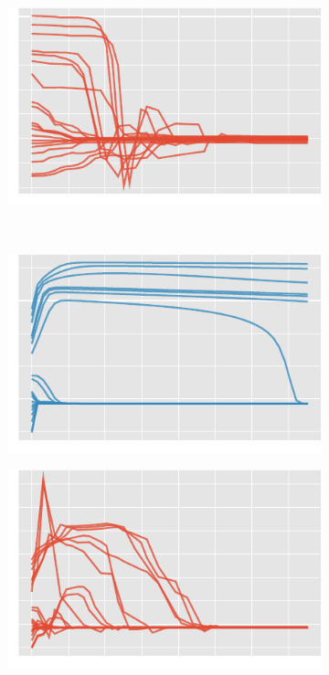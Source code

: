 \begin{figure}[htb]
\begin{subfigure}[t]{0.5\textwidth}
		\includegraphics[width=\textwidth]{img/ballistic_bf_ux}%
    \end{subfigure}\\%
	\begin{subfigure}[b]{0.5\textwidth}%
    	\centering%
    	\includegraphics[width=\textwidth]{img/ballistic_em_r}%
    \end{subfigure}%
    \begin{subfigure}[b]{0.5\textwidth}%
    	\centering%
		\includegraphics[width=\textwidth]{img/ballistic_bf_r}%

\end{subfigure}
\end{figure}
